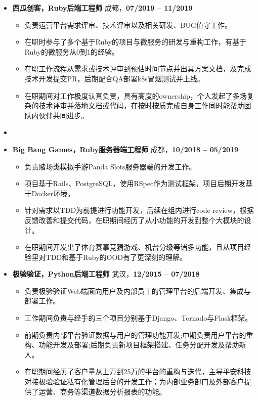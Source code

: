 \documentclass[11pt, a4paper,sans]{moderncv}   %
\begin{document}
\begin{itemize}
\item{\yahei \textbf{西瓜创客，Ruby后端工程师} \hfill 成都，\textbf{07/2019 -- 11/2019}}
\begin{itemize}\yahei
  \item 负责运营平台需求评审、技术评审以及相关研发、BUG值守工作。
  \item 在职时参与了多个基于Ruby的项目与微服务的研发与重构工作，有基于Ruby的微服务从0到1的经验。
  \item 在职工作流程从需求或技术评审到预估时间节点并出具方案文档，及完成技术开发提交PR，后期配合QA部署k8s冒烟测试并上线。
  \item 在职期间对工作极度认真负责，具有高度的ownership，个人发起了多场复杂的技术评审并落地文档或代码，在按时按质完成自身工作同时能帮助团队内伙伴共同进步。
  \end{itemize}

  \vspace{6pt}
\item
  \item{\yahei \textbf{Big Bang Games，Ruby服务器端工程师} \hfill 成都，\textbf{10/2018 -- 05/2019}}
  \begin{itemize}\yahei
    \item 负责赌场类模拟手游Panda Slots服务器端的开发工作。
    \item 项目基于Rails、PostgreSQL，使用RSpec作为测试框架，项目后期开发基于Docker环境。
    \item 针对需求以TDD为前提进行功能开发，后续在组内进行code review，根据反馈改善和提交代码，在职期间经历了从小功能的开发到整个大模块的设计。
    \item 在职期间开发出了体育赛事竞猜游戏、机台分级等诸多功能，且从项目经验里对TDD和基于Ruby的OOD有了更深刻的理解。
  \end{itemize}

  \vspace{6pt}

  \item{\yahei \textbf{极验验证，Python后端工程师} \hfill 武汉，\textbf{12/2015 -- 07/2018}}

    \begin{itemize}\yahei
      \item 负责极验验证Web端面向用户及内部员工的管理平台的后端开发、集成与部署工作。
      \item 工作期间负责与经手的三个项目分别基于Django、Tornado与Flask框架。
      \item 前期负责内部平台验证数据与用户的管理功能开发;中期负责用户平台的重构、功能开发及部署;后期负责新项目框架搭建、任务分配开发及帮助新人。
      \item 在职期间经历了客户量从上万到25万的平台的重构与迭代，主导平安科技对接极验验证私有化管理后台的开发工作；为内部业务部门及外部客户提供了运营、商务等渠道数据分析报表的功能。
    \end{itemize}

\end{itemize}
\vspace{-8pt}
\end{document}
